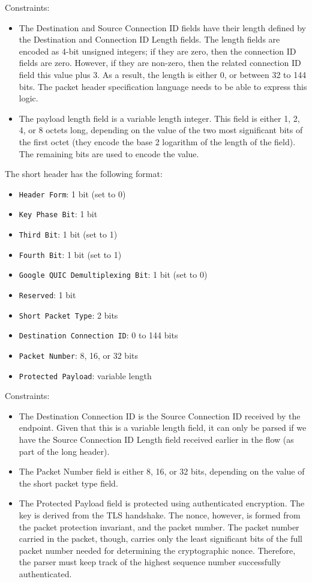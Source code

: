 \documentclass[10pt,a4paper]{article}
\begin{document}
Constraints:
\begin{itemize}
\item The Destination and Source Connection ID fields have their length defined by the
Destination and Connection ID Length fields. The length fields are encoded as 4-bit
unsigned integers; if they are zero, then the connection ID fields are zero. However, if
they are non-zero, then the related connection ID field this value plus 3. As a result,
the length is either 0, or between 32 to 144 bits. The packet header specification
language needs to be able to express this logic.
\item The payload length field is a variable length integer. This field is either 1, 2,
4, or 8 octets long, depending on the value of the two most significant bits of the first
octet (they encode the base 2 logarithm of the length of the field). The remaining bits
are used to encode the value.
\end{itemize}

The short header has the following format:
\begin{itemize}
\item \texttt{Header Form}: 1 bit (set to 0)
\item \texttt{Key Phase Bit}: 1 bit
\item \texttt{Third Bit}: 1 bit (set to 1)
\item \texttt{Fourth Bit}: 1 bit (set to 1)
\item \texttt{Google QUIC Demultiplexing Bit}: 1 bit (set to 0)
\item \texttt{Reserved}: 1 bit
\item \texttt{Short Packet Type}: 2 bits
\item \texttt{Destination Connection ID}: 0 to 144 bits
\item \texttt{Packet Number}: 8, 16, or 32 bits
\item \texttt{Protected Payload}: variable length
\end{itemize}

Constraints:
\begin{itemize}
\item The Destination Connection ID is the Source Connection ID received by the endpoint.
Given that this is a variable length field, it can only be parsed if we have the 
Source Connection ID Length field received earlier in the flow (as part of the long
header). 
\item The Packet Number field is either 8, 16, or 32 bits, depending on the value of the
short packet type field.
\item The Protected Payload field is protected using authenticated encryption. The key is
derived from the TLS handshake. The nonce, however, is formed from the packet protection
invariant, and the packet number. The packet number carried in the packet, though, carries
only the least significant bits of the full packet number needed for determining the
cryptographic nonce. Therefore, the parser must keep track of the highest sequence
number successfully authenticated.
\end{itemize}
\end{document}
